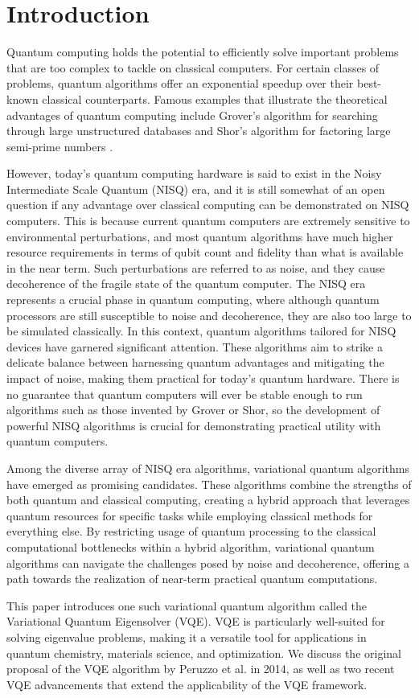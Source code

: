 \section{Introduction}

Quantum computing holds the potential to efficiently solve important problems that are too complex to tackle on classical computers.  For certain classes of problems, quantum algorithms offer an exponential speedup over their best-known classical counterparts.  Famous examples that illustrate the theoretical advantages of quantum computing include Grover's algorithm for searching through large unstructured databases \cite{grover1996fast} and Shor's algorithm for factoring large semi-prime numbers \cite{Shor_1997}.

However, today's quantum computing hardware is said to exist in the Noisy Intermediate Scale Quantum (NISQ) era, and it is still somewhat of an open question if any advantage over classical computing can be demonstrated on NISQ computers.  This is because current quantum computers are extremely sensitive to environmental perturbations, and most quantum algorithms have much higher resource requirements in terms of qubit count and fidelity than what is available in the near term.  Such perturbations are referred to as noise, and they cause decoherence of the fragile state of the quantum computer.  The NISQ era represents a crucial phase in quantum computing, where although quantum processors are still susceptible to noise and decoherence, they are also too large to be simulated classically. In this context, quantum algorithms tailored for NISQ devices have garnered significant attention. These algorithms aim to strike a delicate balance between harnessing quantum advantages and mitigating the impact of noise, making them practical for today's quantum hardware.  There is no guarantee that quantum computers will ever be stable enough to run algorithms such as those invented by Grover or Shor, so the development of powerful NISQ algorithms is crucial for demonstrating practical utility with quantum computers.

Among the diverse array of NISQ era algorithms, variational quantum algorithms have emerged as promising candidates. These algorithms combine the strengths of both quantum and classical computing, creating a hybrid approach that leverages quantum resources for specific tasks while employing classical methods for everything else.  By restricting usage of quantum processing to the classical computational bottlenecks within a hybrid algorithm, variational quantum algorithms can navigate the challenges posed by noise and decoherence, offering a path towards the realization of near-term practical quantum computations.  

This paper introduces one such variational quantum algorithm called the Variational Quantum Eigensolver (VQE).  VQE is particularly well-suited for solving eigenvalue problems, making it a versatile tool for applications in quantum chemistry, materials science, and optimization.  We discuss the original proposal of the VQE algorithm by Peruzzo et al. in 2014, as well as two recent VQE advancements that extend the applicability of the VQE framework.

